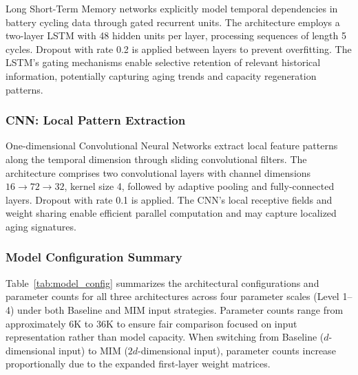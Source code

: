 \documentclass[5p,times]{elsarticle}
\begin{document}
Long Short-Term Memory networks explicitly model temporal dependencies in battery cycling data through gated recurrent units. The architecture employs a two-layer LSTM with 48 hidden units per layer, processing sequences of length 5 cycles. Dropout with rate 0.2 is applied between layers to prevent overfitting. The LSTM's gating mechanisms enable selective retention of relevant historical information, potentially capturing aging trends and capacity regeneration patterns.

\subsubsection{CNN: Local Pattern Extraction}

One-dimensional Convolutional Neural Networks extract local feature patterns along the temporal dimension through sliding convolutional filters. The architecture comprises two convolutional layers with channel dimensions $16 \rightarrow 72 \rightarrow 32$, kernel size 4, followed by adaptive pooling and fully-connected layers. Dropout with rate 0.1 is applied. The CNN's local receptive fields and weight sharing enable efficient parallel computation and may capture localized aging signatures.

\subsubsection{Model Configuration Summary}

Table~\ref{tab:model_config} summarizes the architectural configurations and parameter counts for all three architectures across four parameter scales (Level 1--4) under both Baseline and MIM input strategies. Parameter counts range from approximately 6K to 36K to ensure fair comparison focused on input representation rather than model capacity. When switching from Baseline ($d$-dimensional input) to MIM ($2d$-dimensional input), parameter counts increase proportionally due to the expanded first-layer weight matrices.
\end{document}
